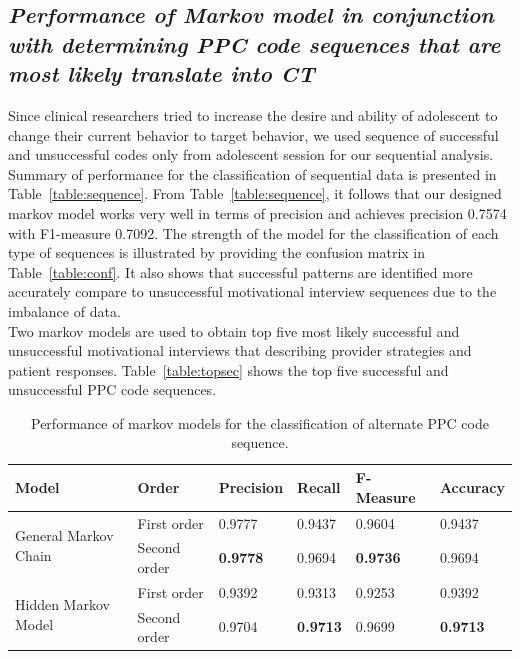 \documentclass{amia}
\begin{document}
\subsection*{\textit{Performance of Markov model in conjunction with determining PPC code sequences that are most likely translate into CT}}
Since clinical researchers tried to increase the desire and ability of adolescent to change their current behavior to target behavior, we used sequence of successful and unsuccessful codes only from adolescent session for our sequential analysis. Summary of performance for the classification of sequential data is presented in Table~\ref{table:sequence}. From Table~\ref{table:sequence}, it follows that our designed markov model works very well in terms of precision and achieves precision 0.7574 with F1-measure 0.7092. The strength of the model for the classification of each type of sequences is illustrated by providing the confusion matrix in Table~\ref{table:conf}. It also shows that successful patterns are identified more accurately compare to unsuccessful motivational interview sequences due to the imbalance of data.\\

Two markov models are used to obtain top five most likely successful and unsuccessful motivational interviews that describing provider strategies and patient responses. Table~\ref{table:topsec} shows the top five successful and unsuccessful PPC code sequences. \\

\begin{table}[h]
\centering
\caption{Performance of markov models for the classification of alternate PPC code sequence.}
\label{tab:result_alt_seq}
  \begin{tabular}{|l|l|l|l|l|l|}
  \hline
   \textbf{Model} & \textbf{Order}  & \textbf{Precision}  & \textbf{Recall} & \textbf{F-Measure} & \textbf{Accuracy}\\ \hline    
    
 \multirow{2}{*}{General Markov Chain} & First order & 0.9777 & 0.9437 & 0.9604 & 0.9437\\\cline{2-6}
 & Second order & \textbf{0.9778} & 0.9694 & \textbf{0.9736} & 0.9694\\ \hline
 \multirow{2}{*}{Hidden Markov Model} & First order & 0.9392 & 0.9313 & 0.9253 & 0.9392\\ \cline{2-6}
 & Second order & 0.9704 & \textbf{0.9713} & 0.9699  & \textbf{0.9713}\\ \hline
 
  \end{tabular}
\end{table}
\end{document}
